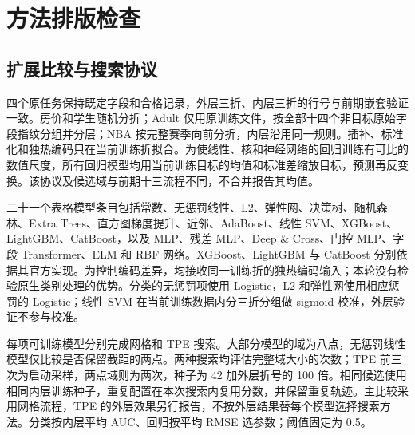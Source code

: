 \documentclass[12pt,journal,onecolumn,a4paper]{IEEEtran}
\begin{document}
\section{方法排版检查}\subsection{扩展比较与搜索协议}\label{sec:new-protocol}
四个原任务保持既定字段和合格记录，外层三折、内层三折的行号与前期嵌套验证一致。房价和学生随机分折；Adult 仅用原训练文件，按全部十四个非目标原始字段指纹分组并分层；NBA 按完整赛季向前分折，内层沿用同一规则。插补、标准化和独热编码只在当前训练折拟合。为使线性、核和神经网络的回归训练有可比的数值尺度，所有回归模型均用当前训练目标的均值和标准差缩放目标，预测再反变换。该协议及候选域与前期十三流程不同，不合并报告其均值。

二十一个表格模型条目包括常数、无惩罚线性、L2、弹性网、决策树、随机森林、Extra Trees、直方图梯度提升、近邻、AdaBoost、线性 SVM、XGBoost、LightGBM、CatBoost，以及 MLP、残差 MLP、Deep \& Cross、门控 MLP、字段 Transformer、ELM 和 RBF 网络。XGBoost、LightGBM 与 CatBoost 分别依据其官方实现\citep{xgboost2016,lightgbm2017,catboost2018}。为控制编码差异，均接收同一训练折的独热编码输入；本轮没有检验原生类别处理的优势。分类的无惩罚项使用 Logistic，L2 和弹性网使用相应惩罚的 Logistic；线性 SVM 在当前训练数据内分三折分组做 sigmoid 校准，外层验证不参与校准。

每项可训练模型分别完成网格和 TPE 搜索。大部分模型的域为八点，无惩罚线性模型仅比较是否保留截距的两点。两种搜索均评估完整域大小的次数；TPE 前三次为启动采样，两点域则为两次，种子为 42 加外层折号的 100 倍。相同候选使用相同内层训练种子，重复配置在本次搜索内复用分数，并保留重复轨迹。主比较采用网格流程，TPE 的外层效果另行报告，不按外层结果替每个模型选择搜索方法。分类按内层平均 AUC、回归按平均 RMSE 选参数；阈值固定为 0.5。
\end{document}
